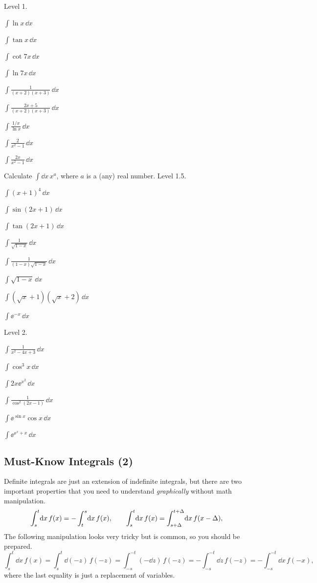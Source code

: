 \documentclass[11pt,pdfa,lastpage]{MishoNote}
\newcommand\intdx{\displaystyle\int\!\dd x\,}
\newcommand\incdx[2]{\displaystyle\int_{#1}^{#2}\!\dd x\,}
\newcommand\INT[2][\relax]{\item$\displaystyle\int\!#2\,\dd x$\ifx\relax#1\relax\relax\relax\else{\quad#1}\fi}
\begin{document}
\begin{quizzes}
\end{quizzes}

\begin{problems}
  \Problem[S] Level 1.
  \begin{menumerate}{3}
    \INT{\ln x}
    \INT{\tan x}
    \INT{\cot 7x}
    \INT{\ln 7x}
    \INT{\frac{1}{(x+2)(x+3)}}
    \INT{\frac{2x+5}{(x+2)(x+3)}}
    \INT{\frac{1/x}{\ln x}}
    \INT{\frac{2}{x^2-1}}
    \INT{\frac{2x}{x^2-1}}
 \end{menumerate}
  \Problem[S] Calculate $\intdx x^a$, where $a$ is a (any) real number.
  \Problem[A] Level 1.5. 
  \begin{menumerate}{2}
    \INT{(x+1)^4}
    \INT{\sin(2x+1)}
    \INT{\tan(2x+1)}
    \INT{\frac1{\sqrt{1-x}}}
    \INT{\frac1{(1-x)\sqrt{1-x}}}
    \INT{\sqrt{1-x}}
    \INT{\left(\sqrt x+1\right)\left(\sqrt x+2\right)}
    \INT{\ee^{-x}}
  \end{menumerate}
  \Problem[B] Level 2.
  \begin{menumerate}{3}
    \INT{\frac{1}{x^2 - 4x + 3}}
    \INT{\cos^3x}
    \INT{2x\ee^{x^2}}
    \INT{\frac{1}{\cos^2(2x-1)}}
    \INT{\ee^{\sin x}\cos x}
    \INT{\ee^{\ee^x+x}}
  \end{menumerate}
  \end{problems}

\newpage
\subsection{Must-Know Integrals (2)}
Definite integrals are just an extension of indefinite integrals, but there are two important properties that you need to understand \emph{graphically} without math manipulation.
\[
\incdx st f(x)=-\incdx ts f(x),\qquad
\incdx st f(x)=\incdx{s+\Delta}{t+\Delta} f(x-\Delta),\\
\]
The following manipulation looks very tricky but is common, so you should be prepared.
\[
\incdx st f(x)
=\int_{s}^{t}\dd(-z)\,f(-z)
=\int_{-s}^{-t}(-\dd z)\,f(-z)
=-\int_{-s}^{-t}\dd z\,f(-z)
=-\int_{-s}^{-t}\dd x\,f(-x),
\]
where the last equality is just a replacement of variables.
\end{document}

